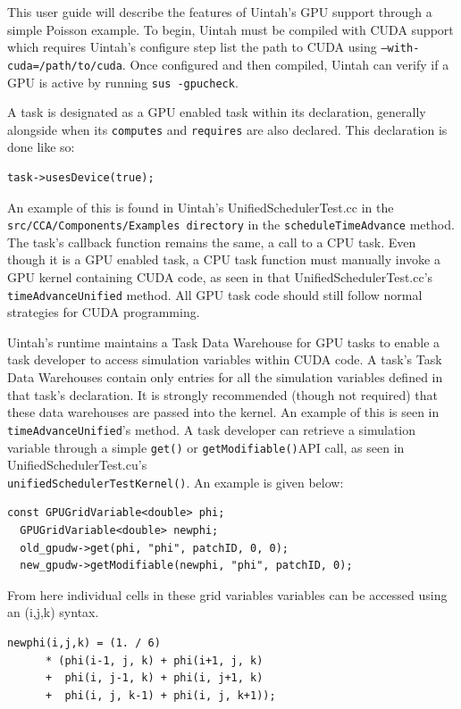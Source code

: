 This user guide will describe the features of Uintah's GPU support through a simple Poisson example.  To begin, Uintah must be compiled with CUDA support which requires Uintah's configure step list the path to CUDA using  \texttt{--with-cuda=/path/to/cuda}.  Once configured and then compiled, Uintah can verify if a GPU is active by running \texttt{sus -gpucheck}.  

A task is designated as a GPU enabled task within its declaration, generally alongside when its  \texttt{computes} and  \texttt{requires} are also declared.  This declaration is done like so:  

\begin{Verbatim}[fontsize=\footnotesize]
  task->usesDevice(true);
\end{Verbatim} 

An example of this is found in Uintah's UnifiedSchedulerTest.cc in the \\ \texttt{src/CCA/Components/Examples directory} in the  \texttt{scheduleTimeAdvance} method.  The task's callback function remains the same, a call to a CPU task.  Even though it is a GPU enabled task, a CPU task function must manually invoke a GPU kernel containing CUDA code, as seen in that UnifiedSchedulerTest.cc's \texttt{timeAdvanceUnified} method.  All GPU task code should still follow normal strategies for CUDA programming.

Uintah's runtime maintains a Task Data Warehouse for GPU tasks to enable a task developer to access simulation variables within CUDA code.  A task's Task Data Warehouses contain only entries for all the simulation variables defined in that task's declaration.  It is strongly recommended (though not required) that these data warehouses are passed into the kernel. An example of this is seen in \texttt{timeAdvanceUnified}'s method.  A task developer can retrieve a simulation variable through a simple \texttt{get()} or \texttt{getModifiable()}API call, as seen in UnifiedSchedulerTest.cu's \\ \texttt{unifiedSchedulerTestKernel()}.  An example is given below:

\begin{Verbatim}[fontsize=\footnotesize]
  const GPUGridVariable<double> phi;
  GPUGridVariable<double> newphi;
  old_gpudw->get(phi, "phi", patchID, 0, 0);
  new_gpudw->getModifiable(newphi, "phi", patchID, 0); 
\end{Verbatim} 

From here individual cells in these grid variables variables can be accessed using an (i,j,k) syntax.    
\begin{Verbatim}[fontsize=\footnotesize]
      newphi(i,j,k) = (1. / 6)
      * (phi(i-1, j, k) + phi(i+1, j, k)
      +  phi(i, j-1, k) + phi(i, j+1, k)
      +  phi(i, j, k-1) + phi(i, j, k+1));
\end{Verbatim} 

